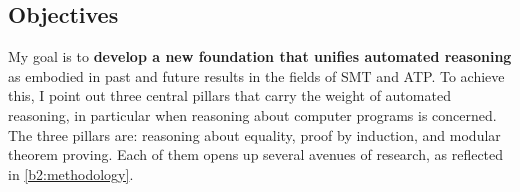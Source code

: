 \subsection{Objectives}

My goal is to \textbf{develop a new foundation that unifies automated reasoning} as embodied in past and future results in the fields of SMT and ATP.
To achieve this, I point out three central pillars that carry the weight of automated reasoning,
in particular when reasoning about computer programs is concerned.
The three pillars are: reasoning about equality, proof by induction, and modular theorem proving.
Each of them opens up several avenues of research, as reflected in \autoref{b2:methodology}.